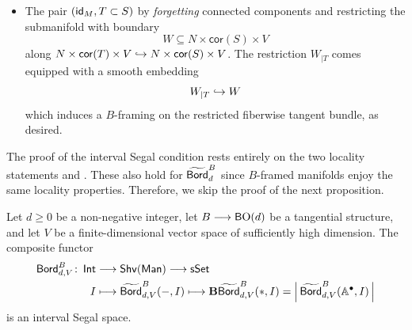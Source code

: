 \begin{definition}
\begin{itemize}
    \item[($\Int$):] The pair $(\operatorname{\sf id}_M, T\subset S)$ by \emph{forgetting} connected components and restricting the submanifold with boundary 
    \begin{equation}
        W \subseteq N \times \mathsf{cor}(S) \times V
    \end{equation}
    along $N \times \mathsf{cor}(T)\times V \hookrightarrow N \times \mathsf{cor}(S)\times V$. The restriction $W_{|T}$ comes equipped with a smooth embedding 
    \begin{equation}
        W_{|T} \hookrightarrow W
    \end{equation}
    which induces a $B$-framing on the restricted fiberwise tangent bundle, as desired.
    \end{itemize}  
\end{definition}


\begin{remark}
    The proof of the interval Segal condition rests entirely on the two locality statements  and . These also hold for $\widetilde{\operatorname{\mathsf{Bord}}}_{d}^B$ since $B$-framed manifolds enjoy the same locality properties. Therefore, we skip the proof of the next proposition.
\end{remark}

\begin{proposition}\label{ch3:: prop: Segal condition with structrue}
    Let $d \geq 0$ be a non-negative integer, let $B \longrightarrow \operatorname{{\mathsf BO}}(d)$ be a tangential structure, and let $V$ be a finite-dimensional vector space of sufficiently high dimension. The composite functor
    \begin{align}
        \operatorname{\mathsf{Bord}}_{d,V}^{B} \colon \operatorname{\mathsf{Int}} &\longrightarrow \operatorname{\sf Shv}(\operatorname{\sf Man})  \longrightarrow \operatorname{\sf sSet}  \\
         I &\longmapsto \widetilde{\operatorname{\mathsf{Bord}}}_{d,V}^{B}(-,I) \longmapsto \mathbf B\widetilde{\operatorname{\mathsf{Bord}}}_{d,V}^{B}(*,I) = \left|\,\widetilde{\operatorname{\mathsf{Bord}}}_{d,V}^{B}(\mathbb A^\bullet,I)\,\right| 
    \end{align}
    is an interval Segal space. 
\end{proposition}










